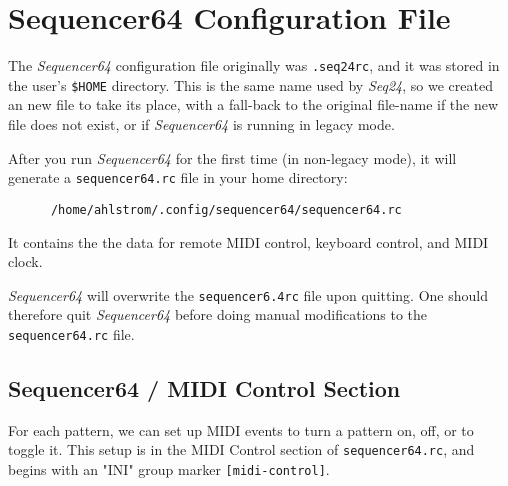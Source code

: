 %
%
%

\section{Sequencer64 Configuration File}
\label{sec:seq64_rc_file}

   \index{[sequencer64.rc]}   %
   The \textsl{Sequencer64} configuration file originally was \texttt{.seq24rc},
   and it was stored in the user's \texttt{\$HOME} directory.
   This is the same name used by \textsl{Seq24}, so we created an new file
   to take its place, with a fall-back to the original file-name if the new
   file does not exist, or if \textsl{Sequencer64} is running in
   legacy mode.

   After you run \textsl{Sequencer64} for the first time (in non-legacy
   mode), it will generate a \texttt{sequencer64.rc} file in your home
   directory:

   \begin{verbatim}
      /home/ahlstrom/.config/sequencer64/sequencer64.rc
   \end{verbatim}

   It contains the the data for remote MIDI control, keyboard
   control, and MIDI clock.

   \textsl{Sequencer64} will overwrite the \texttt{sequencer6.4rc} file upon
   quitting.  One should therefore quit \textsl{Sequencer64} before doing
   manual modifications to the
   \texttt{sequencer64.rc} file.

\subsection{Sequencer64 / MIDI Control Section}
\label{subsec:seq64_rc_file_midi_control}

   For each pattern, we can set up MIDI events to turn a 
	pattern on, off, or to toggle it.  This setup is in the 
   MIDI Control section of \texttt{sequencer64.rc}, and begins with an
   "INI" group marker \texttt{[midi-control]}.
	
